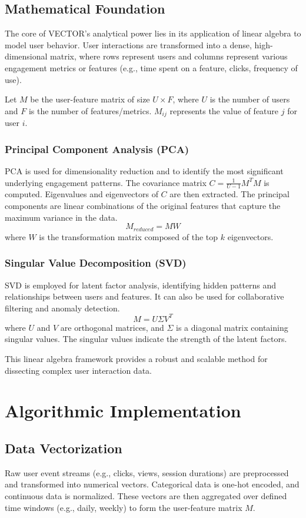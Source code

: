 \documentclass[10pt]{article}
\begin{document}
\subsection{Mathematical Foundation}
The core of VECTOR's analytical power lies in its application of linear algebra to model user behavior. User interactions are transformed into a dense, high-dimensional matrix, where rows represent users and columns represent various engagement metrics or features (e.g., time spent on a feature, clicks, frequency of use).

Let $M$ be the user-feature matrix of size $U \times F$, where $U$ is the number of users and $F$ is the number of features/metrics.
$M_{ij}$ represents the value of feature $j$ for user $i$.

\subsubsection{Principal Component Analysis (PCA)}
PCA is used for dimensionality reduction and to identify the most significant underlying engagement patterns.
The covariance matrix $C = \frac{1}{U-1} M^T M$ is computed.
Eigenvalues and eigenvectors of $C$ are then extracted. The principal components are linear combinations of the original features that capture the maximum variance in the data.
\[
    M_{reduced} = M W
\]
where $W$ is the transformation matrix composed of the top $k$ eigenvectors.

\subsubsection{Singular Value Decomposition (SVD)}
SVD is employed for latent factor analysis, identifying hidden patterns and relationships between users and features. It can also be used for collaborative filtering and anomaly detection.
\[
    M = U \Sigma V^T
\]
where $U$ and $V$ are orthogonal matrices, and $\Sigma$ is a diagonal matrix containing singular values. The singular values indicate the strength of the latent factors.

This linear algebra framework provides a robust and scalable method for dissecting complex user interaction data.

\section{Algorithmic Implementation}
\subsection{Data Vectorization}
Raw user event streams (e.g., clicks, views, session durations) are preprocessed and transformed into numerical vectors. Categorical data is one-hot encoded, and continuous data is normalized. These vectors are then aggregated over defined time windows (e.g., daily, weekly) to form the user-feature matrix $M$.
\end{document}
